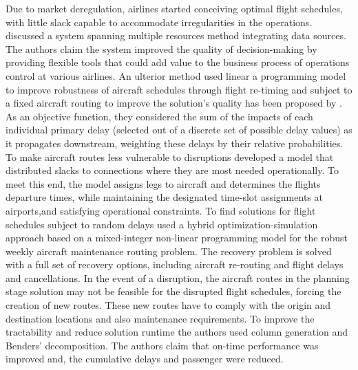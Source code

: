 \documentclass[ijoo,nonblindrev]{informs-ijoo}
\begin{document}
Due to market deregulation, airlines started conceiving optimal flight schedules, with little slack capable to accommodate irregularities in the operations. \citep{Kohl2007149} discussed a system spanning multiple resources method integrating data sources. The authors claim the system improved the quality of decision-making by providing flexible tools that could add value to the business process of operations control at various airlines. An ulterior method used linear a programming model to improve robustness of aircraft schedules through flight re-timing and subject to a fixed aircraft routing to improve the solution's quality has been proposed by \citep{AhmadBeygi2010}. As an objective function, they considered the sum of the impacts of each individual primary delay (selected out of a discrete set of possible delay values) as it propagates downstream, weighting these delays by their relative probabilities.
To make aircraft routes less vulnerable to disruptions \cite{Aloulou2013} developed a model that  distributed slacks to connections where they are most needed operationally. To meet this end, the model assigns legs to aircraft and determines the flights departure times, while maintaining the designated time-slot assignments at airports,and satisfying operational constraints.
To find solutions for flight schedules subject to random delays \citep{Ahmed2017} used a hybrid optimization-simulation approach based on a mixed-integer non-linear programming model for the robust weekly aircraft maintenance routing problem. The recovery problem is solved with a full set of recovery options, including aircraft re-routing and flight delays and cancellations. In the event of a disruption, the aircraft routes in the planning stage solution may not be feasible for the disrupted flight schedules, forcing the creation of new routes. These new routes have to comply with the origin and destination locations and also maintenance requirements. To improve the tractability and reduce solution runtime the authors used column generation and Benders' decomposition. The authors claim that on-time performance was improved and, the cumulative delays and passenger were reduced.
\end{document}
